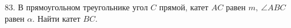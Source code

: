 83. В прямоугольном треугольнике угол $C$ прямой, катет $AC$ равен $m,\ \angle ABC$ равен $\alpha.$ Найти катет $BC.$\\
